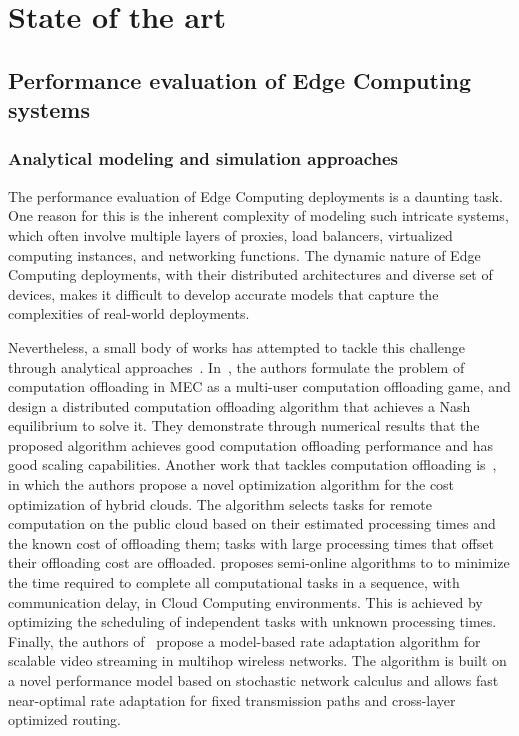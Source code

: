 \section{State of the art}\label{sec:state-of-the-art}
\subsection{Performance evaluation of Edge Computing systems}
\subsubsection{Analytical modeling and simulation approaches}

The performance evaluation of Edge Computing deployments is a daunting task.
One reason for this is the inherent complexity of modeling such intricate systems, which often involve multiple layers of proxies, load balancers, virtualized computing instances, and networking functions.
The dynamic nature of Edge Computing deployments, with their distributed architectures and diverse set of devices, makes it difficult to develop accurate models that capture the complexities of real-world deployments.

Nevertheless, a small body of works has attempted to tackle this challenge through analytical approaches~\cite{chen2015efficient,champati2015one,champati2016semi,al2017reliable}.
In~\cite{chen2015efficient}, the authors formulate the problem of computation offloading in \gls{MEC} as a multi-user computation offloading game, and design a distributed computation offloading algorithm that achieves a Nash equilibrium to solve it.
They demonstrate through numerical results that the proposed algorithm achieves good computation offloading performance and has good scaling capabilities.
Another work that tackles computation offloading is~\cite{champati2015one}, in which the authors propose a novel optimization algorithm for the cost optimization of hybrid clouds.
The algorithm selects tasks for remote computation on the public cloud based on their estimated processing times and the known cost of offloading them; tasks with large processing times that offset their offloading cost are offloaded.\@
\cite{champati2016semi} proposes semi-online algorithms to to minimize the time required to complete all computational tasks in a sequence, with communication delay, in Cloud Computing environments.
This is achieved by optimizing the scheduling of independent tasks with unknown processing times.
Finally, the authors of~\cite{al2017reliable} propose a model-based rate adaptation algorithm for scalable video streaming in multihop wireless networks.
The algorithm is built on a novel performance model based on stochastic network calculus and allows fast near-optimal rate adaptation for fixed transmission paths and cross-layer optimized routing.

